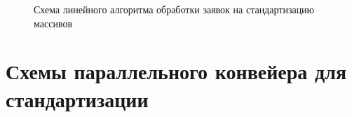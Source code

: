 \newpage
\begin{figure}[h!]
	
	
	\caption{Схема линейного алгоритма обработки заявок на стандартизацию массивов}
	
	\label{fig:linear}
	
\end{figure}

\newpage
\section{Схемы параллельного конвейера для стандартизации}

